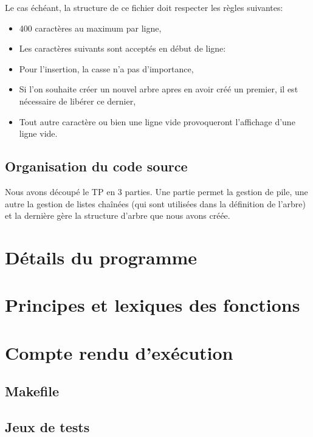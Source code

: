 \documentclass{report}
\begin{document}
      \newpage
      Le cas échéant, la structure de ce fichier doit respecter les règles suivantes:
      \begin{itemize}[noitemsep,nolistsep]
        \item 400 caractères au maximum par ligne,
        \item Les caractères suivants sont acceptés en début de ligne:
        \item Pour l'insertion, la casse n'a pas d'importance,
        \item Si l'on souhaite créer un nouvel arbre apres en avoir créé un premier, il est nécessaire de libérer ce dernier,
        \item Tout autre caractère ou bien une ligne vide provoqueront l'affichage d'une ligne vide.
      \end{itemize}
    \section{Organisation du code source}
      Nous avons découpé le TP en 3 parties. Une partie permet la gestion de pile, une autre la gestion de listes chaînées (qui sont utilisées dans la définition de l'arbre) et la dernière gère la structure d'arbre que nous avons créée.
    

  \chapter{Détails du programme}
    

  \chapter{Principes et lexiques des fonctions}
    

  \chapter{Compte rendu d'exécution}
    \section{Makefile}

    \section{Jeux de tests}
      
\end{document}
